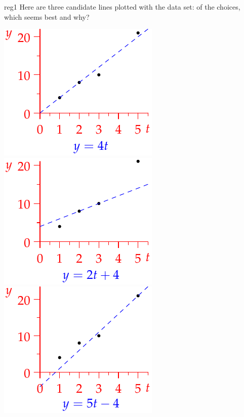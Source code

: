 \begin{example}{}{reg1}
Here are three candidate lines plotted with the data set: of the choices, which seems best and why?
\begin{center}
\hfill
\includegraphics{reg-line2-1}
\hfill
\includegraphics{reg-line2-2}
\hfill
\includegraphics{reg-line2-3}
\hspace*{\fill}
\end{center}


\end{example}
